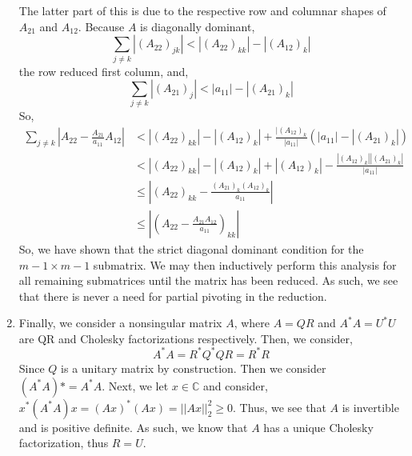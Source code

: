 \documentclass[letterpaper,10pt]{article}
\newcommand{\C}{\mathbb{C}}
\begin{document}
\begin{enumerate}
The latter part of this is due to the respective row and columnar shapes of $A_{21}$ and $A_{12}$. Because $A$ is diagonally dominant, 
\[\sum_{j\neq k}|(A_{22})_{jk}| < |(A_{22})_{kk}|-|(A_{12})_k|\]
the row reduced first column, and,
\[\sum_{j\neq k}|(A_{21})_{j}| < |a_{11}|-|(A_{21})_k|\]
So, 
\begin{align*}
\sum_{j\neq k}\left|A_{22}-\frac{A_{21}}{a_{11}}A_{12}\right|&<|(A_{22})_{kk}|-|(A_{12})_k|+\frac{|(A_{12})_k}{|a_{11}|}(|a_{11}|-|(A_{21})_k|)\\
&< |(A_{22})_{kk}|-|(A_{12})_k|+|(A_{12})_k|-\frac{|(A_{12})_k||(A_{21})_k|}{|a_{11}|}\\
&\leq \left|(A_{22})_{kk}-\frac{(A_{21})_k(A_{12})_k}{a_11}\right|\\
&\leq \left|\left(A_{22}-\frac{A_{21}A_{12}}{a_{11}}\right)_{kk}\right|
\end{align*}
So, we have shown that the strict diagonal dominant condition for the $m-1\times m-1$ submatrix. We may then inductively perform this analysis for all remaining submatrices until the matrix has been reduced. As such, we see that there is never a need for partial pivoting in the reduction.
\item Finally, we consider a nonsingular matrix $A$, where $A=QR$ and $A^*A=U^*U$ are QR and Cholesky factorizations respectively. Then, we consider,
\[A^*A=R^*Q^*QR=R^*R\]
Since $Q$ is a unitary matrix by construction. Then we consider $(A^*A)*=A^*A$. Next, we let $x\in \C$ and consider, $x^*(A^*A)x=(Ax)^*(Ax)=||Ax||_2^2\geq 0$. Thus, we see that $A$ is invertible and is positive definite. As such, we know that $A$ has a unique Cholesky factorization, thus $R=U$.
\end{enumerate}
\end{document}
